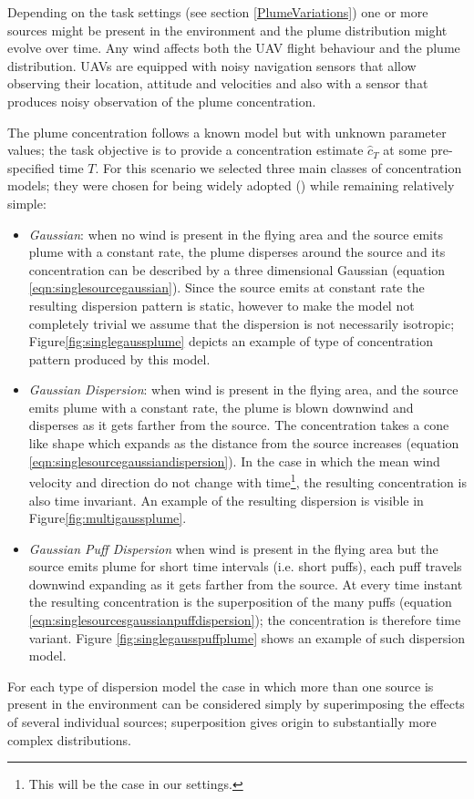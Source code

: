 \documentclass[a4paper,11pt]{report}
\begin{document}
Depending on the task settings (see section \ref{PlumeVariations}) one or more sources might be present in the environment and the plume distribution might evolve over time. Any wind affects both the UAV flight behaviour and the plume distribution.
UAVs are equipped with noisy navigation sensors that allow observing their location, attitude and velocities and also with a sensor that produces noisy observation of the plume concentration. 

The plume concentration follows a known model but with unknown parameter values; the task objective is to provide a concentration estimate $\hat{c}_T$ at some pre-specified time $T$. 
For this scenario we selected three main classes of concentration models; they were chosen for being widely adopted (\cite{stockie2011}) while remaining relatively simple:
\begin{itemize}
\item \textit{Gaussian}: when no wind is present in the flying area and the source emits plume with a constant rate, the plume disperses around the source and its concentration can be described by a three dimensional Gaussian (equation \ref{eqn:singlesourcegaussian}). Since the source emits at constant rate the resulting dispersion pattern is static, however to make the model not completely trivial we assume that the dispersion is not necessarily isotropic; Figure\ref{fig:singlegaussplume} depicts an example of type of concentration pattern produced by this model.
\item \textit{Gaussian Dispersion}: when wind is present in the flying area, and the source emits plume with a constant rate, the plume is blown downwind and disperses as it gets farther from the source. The concentration takes a cone like shape which expands as the distance from the source increases (equation \ref{eqn:singlesourcegaussiandispersion}). In the case in which the mean wind velocity and direction do not change with time\footnote{This will be the case in our settings.}, the resulting concentration is also time invariant. An example of the resulting dispersion is visible in Figure\ref{fig:multigaussplume}.
\item \textit{Gaussian Puff Dispersion} when wind is present in the flying area but the source emits plume for short time intervals (i.e. short puffs), each puff travels downwind expanding as it gets farther from the source. At every time instant the resulting concentration is the superposition of the many puffs (equation \ref{eqn:singlesourcesgaussianpuffdispersion}); the concentration is therefore time variant.  Figure \ref{fig:singlegausspuffplume} shows an example of such dispersion model.
\end{itemize}
For each type of dispersion model the case in which more than one source is present in the environment can be considered simply by superimposing the effects of several individual sources; superposition gives origin to substantially more complex distributions.
\end{document}
